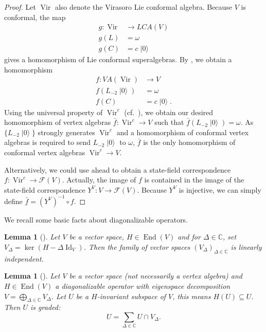 \documentclass[a4paper, 12pt, reqno]{amsart}
\newtheorem{lemma}[theorem]{Lemma}
\theoremstyle{remark}
\numberwithin{equation}{subsection}
\DeclareMathOperator{\Vir}{Vir}
\DeclareMathOperator{\Id}{Id}
\DeclareMathOperator{\End}{End}
\DeclareMathOperator{\vac}{|0\rangle}
\begin{document}
\begin{proof}
  Let $\Vir$ also denote the Virasoro Lie conformal algebra.
  Because $V$ is conformal, the map
  \begin{align*}
    g: \Vir &\to LCA(V) \\
    g(L) &= \omega \\
    g(C) &= c\vac
  \end{align*}
  gives a homomorphism of Lie conformal superalgebras.
  By , we obtain a homomorphism
  \begin{align*}
    f: VA(\Vir) &\to V \\
    f(L_{-2}\vac) &= \omega \\
    f(C) &= c\vac.
  \end{align*}
  Using the universal property of $\Vir^c$ (cf.\ ), we obtain our desired homomorphism of vertex algebras $\bar{f}: \Vir^c \to V$ such that $\bar{f}(L_{-2}\vac) = \omega$.
  As $\{L_{-2}\vac\}$ strongly generates $\Vir^c$ and a homomorphism of conformal vertex algebras is required to send $L_{-2}\vac$ to $\omega$, $\bar{f}$ is the only homomorphism of conformal vertex algebras $\Vir^c \to V$.
  
  Alternatively, we could use  ahead to obtain a state-field correspondence $f: \Vir^c \to \mathcal{F}(V)$.
  Actually, the image of $f$ is contained in the image of the state-field correspondence $Y^V: V \to \mathcal{F}(V)$.
  Because $Y^V$ is injective, we can simply define $\bar{f} = (Y^V)^{-1}\circ f$.
\end{proof}

We recall some basic facts about diagonalizable operators.

\begin{lemma}[{\cite[\S6.2]{hoffman_linear_1971}}]
  \label{lmm:8}
  Let $V$ be a vector space, $H \in \End(V)$ and for $\Delta \in \mathbb{C}$, set $V_{\Delta} = \ker(H - \Delta\Id_V)$.
  Then the family of vector spaces $(V_{\Delta})_{\Delta \in \mathbb{C}}$ is linearly independent.
\end{lemma}

\begin{lemma}[{\cite[Corollary 1.1]{kac_bombay_2013}}]
  \label{lmm:9}
  Let $V$ be a vector space (not necessarily a vertex algebra) and $H \in \End(V)$ a diagonalizable operator with eigenspace decomposition $V = \bigoplus_{\Delta \in \mathbb{C}}V_{\Delta}$.
  Let $U$ be a $H$-invariant subspace of $V$, this means $H(U) \subseteq U$.
  Then $U$ is graded:
  \begin{equation*}
    U = \sum_{\Delta \in \mathbb{C}}U \cap V_{\Delta}.
  \end{equation*}
\end{lemma}
\end{document}
